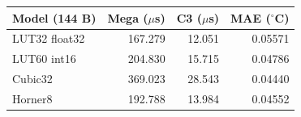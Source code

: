 \begin{tabular}{lrrr}
\hline
Model (144 B) & Mega ($\mu$s) & C3 ($\mu$s) & MAE ($^\circ$C) \\
\hline
LUT32 float32 & 167.279 & 12.051 & 0.05571 \\
LUT60 int16 & 204.830 & 15.715 & 0.04786 \\
Cubic32 & 369.023 & 28.543 & 0.04440 \\
Horner8 & 192.788 & 13.984 & 0.04552 \\
\hline
\end{tabular}
